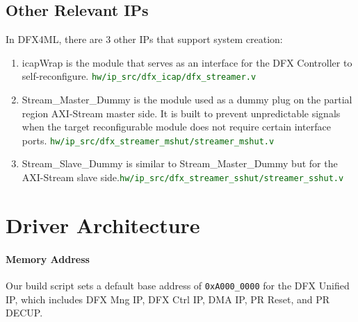 \documentclass{cernatsnote}
\newcommand{\addr}[1]{\texttt{\small #1}}
\begin{document}
\subsection{Other Relevant IPs}

In DFX4ML, there are 3 other IPs that support system creation:
  \begin{enumerate}
    \item icapWrap is the module that serves as an interface for the DFX Controller to self-reconfigure. \textcolor{darkgreen}{\texttt{hw/ip\_src/dfx\_icap/dfx\_streamer.v}}
    \item Stream\_Master\_Dummy is the module used as a dummy plug on the partial region AXI-Stream master side. It is built to prevent unpredictable signals when the target reconfigurable module does not require certain interface ports. \newline\textcolor{darkgreen}{\texttt{hw/ip\_src/dfx\_streamer\_mshut/streamer\_mshut.v}}
    \item Stream\_Slave\_Dummy is similar to Stream\_Master\_Dummy but for the AXI-Stream slave side.\newline\textcolor{darkgreen}{\texttt{hw/ip\_src/dfx\_streamer\_sshut/streamer\_sshut.v}}
  \end{enumerate}


\section{Driver Architecture}


\paragraph{\textbf{Memory Address}}

Our build script sets a default base address of \addr{0xA000\_0000} for the DFX Unified IP, which includes DFX Mng IP, DFX Ctrl IP, DMA IP, PR Reset, and PR DECUP.
\end{document}
